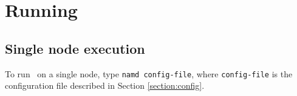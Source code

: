 
%
%
%
%
%
%
%
%
%
%
%
%
% 

\section{Running \NAMD}
\label{section:run}

\subsection{Single node execution}

To run \NAMD\ on a single node, type {\tt namd config-file}, where
{\tt config-file} is the configuration file described in Section
\ref{section:config}.

